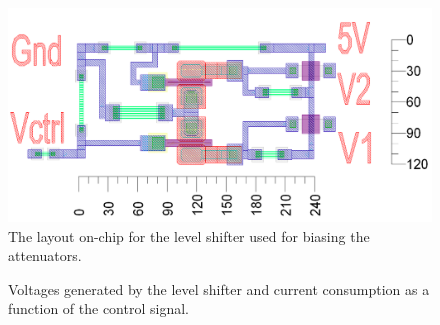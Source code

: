 		
		\begin{figure}[h!]
			\centering
			\includegraphics[width=1.0\textwidth]{fig/attenuators/level_shifter_layout}
			\caption[Level shifter layout]{The layout on-chip for the level shifter used for biasing the attenuators.}\label{fig:level_shifter_layout}
		\end{figure}


	\begin{figure}[h!]
			\centering 
			\caption[Level shifter output]{ Voltages generated by the level shifter and  current consumption as a function of the control signal.}\label{fig:level_shifter_data}
		\end{figure}

		
		






